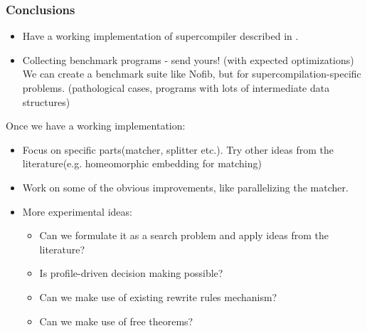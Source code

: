 \documentclass{beamer}
\begin{document}
\begin{frame}
    \frametitle{Conclusions}

    \begin{itemize}[<+->]
        \item[]
            Have a working implementation of supercompiler described in
            \citet{callbyneed-sc}.
        \item[]
            Collecting benchmark programs - send yours! (with expected
            optimizations)
            \newline
            We can create a benchmark suite like Nofib, but for
            supercompilation-specific problems. (pathological cases, programs
            with lots of intermediate data structures)
    \end{itemize}
\end{frame}

\begin{frame}
    Once we have a working implementation:
    \begin{itemize}
        \item
            Focus on specific parts(matcher, splitter etc.). Try other ideas
            from the literature(e.g. homeomorphic embedding for matching)
        \item
            Work on some of the obvious improvements, like parallelizing
            the matcher.
        \item
            More experimental ideas:
            \begin{itemize}
                \item[]
                    Can we formulate it as a search problem and apply ideas from
                    the literature?
                \item[]
                    Is profile-driven decision making possible?
                \item[]
                    Can we make use of existing rewrite rules mechanism?
                \item[]
                    Can we make use of free theorems?
            \end{itemize}
    \end{itemize}
\end{frame}
\end{document}

